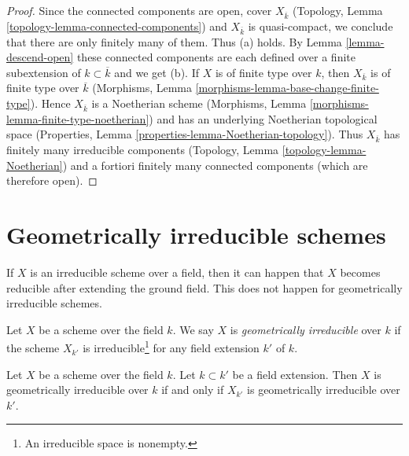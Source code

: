 \begin{proof}
Since the connected components are open, cover $X_{\overline{k}}$
(Topology, Lemma \ref{topology-lemma-connected-components}) and
$X_{\overline{k}}$ is quasi-compact, we conclude that there are only
finitely many of them. Thus (a) holds.
By Lemma \ref{lemma-descend-open} these connected components
are each defined over a finite subextension of $k \subset \overline{k}$
and we get (b).
If $X$ is of finite type over $k$, then $X_{\overline{k}}$ is of finite
type over $\overline{k}$
(Morphisms, Lemma \ref{morphisms-lemma-base-change-finite-type}).
Hence $X_{\overline{k}}$ is a Noetherian scheme
(Morphisms, Lemma \ref{morphisms-lemma-finite-type-noetherian}) and has
an underlying Noetherian topological space
(Properties, Lemma \ref{properties-lemma-Noetherian-topology}).
Thus $X_{\overline{k}}$ has finitely many irreducible components
(Topology, Lemma \ref{topology-lemma-Noetherian})
and a fortiori finitely many connected components (which are
therefore open).
\end{proof}









\section{Geometrically irreducible schemes}
\label{section-geometrically-irreducible}

\noindent
If $X$ is an irreducible scheme over a field, then it can happen that $X$
becomes reducible after extending the ground field. This does not happen
for geometrically irreducible schemes.

\begin{definition}
\label{definition-geometrically-irreducible}
Let $X$ be a scheme over the field $k$.
We say $X$ is {\it geometrically irreducible} over $k$ if the scheme
$X_{k'}$ is irreducible\footnote{An irreducible space is nonempty.}
for any field extension $k'$ of $k$.
\end{definition}

\begin{lemma}
\label{lemma-geometrically-irreducible-check-after-extension}
Let $X$ be a scheme over the field $k$.
Let $k \subset k'$ be a field extension.
Then $X$ is geometrically irreducible over $k$ if and only if
$X_{k'}$ is geometrically irreducible over $k'$.
\end{lemma}

